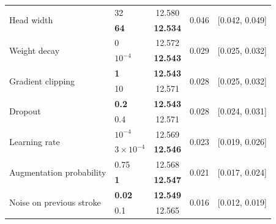 \documentclass[12pt]{report}
\begin{document}
\begin{table}[htbp]
\begin{tabular}{llccc}
        \midrule
        \multirow{2}{*}{Head width}               & 32                                 & 12.580          & \multirow{2}{*}{0.046} & \multirow{2}{*}{[0.042, 0.049]} \\
                                                  & \textbf{64}                        & \textbf{12.534} &                        &                                 \\
        \midrule
        \multirow{2}{*}{Weight decay}             & 0                                  & 12.572          & \multirow{2}{*}{0.029} & \multirow{2}{*}{[0.025, 0.032]} \\
                                                  & \textbf{\boldmath$10^{-4}$}        & \textbf{12.543} &                        &                                 \\
        \midrule
        \multirow{2}{*}{Gradient clipping}        & \textbf{1}                         & \textbf{12.543} & \multirow{2}{*}{0.028} & \multirow{2}{*}{[0.025, 0.032]} \\
                                                  & 10                                 & 12.571          &                        &                                 \\
        \midrule
        \multirow{2}{*}{Dropout}                  & \textbf{0.2}                       & \textbf{12.543} & \multirow{2}{*}{0.028} & \multirow{2}{*}{[0.024, 0.031]} \\
                                                  & 0.4                                & 12.571          &                        &                                 \\
        \midrule
        \multirow{2}{*}{Learning rate}            & $10^{-4}$                          & 12.569          & \multirow{2}{*}{0.023} & \multirow{2}{*}{[0.019, 0.026]} \\
                                                  & \textbf{\boldmath$3\times10^{-4}$} & \textbf{12.546} &                        &                                 \\
        \midrule
        \multirow{2}{*}{Augmentation probability} & 0.75                               & 12.568          & \multirow{2}{*}{0.021} & \multirow{2}{*}{[0.017, 0.024]} \\
                                                  & \textbf{1}                         & \textbf{12.547} &                        &                                 \\
        \midrule
        \multirow{2}{*}{Noise on previous stroke} & \textbf{0.02}                      & \textbf{12.549} & \multirow{2}{*}{0.016} & \multirow{2}{*}{[0.012, 0.019]} \\
                                                  & 0.1                                & 12.565          &                        &                                 \\
        \bottomrule
    \end{tabular}
\end{table}
\end{document}
